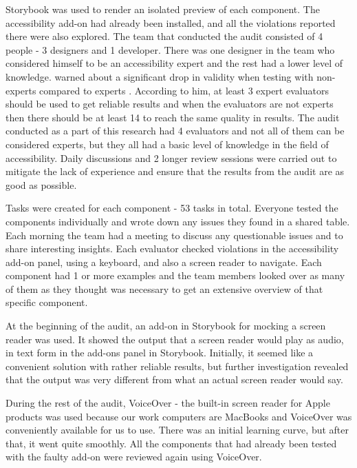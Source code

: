 \documentclass{master_thesis}
\begin{document}
Storybook was used to render an isolated preview of each component. The accessibility add-on had already been installed, and all the violations reported there were also explored. The team that conducted the audit consisted of 4 people - 3 designers and 1 developer.
There was one designer in the team who considered himself to be an accessibility expert and the rest had a lower level of knowledge. \citeauthor{Brajnik2011} warned about a significant drop in validity when testing with non-experts compared to experts \citep{Brajnik2011}. According to him, at least 3 expert evaluators should be used to get reliable results and when the evaluators are not experts then there should be at least 14 to reach the same quality in results. The audit conducted as a part of this research had 4 evaluators and not all of them can be considered experts, but they all had a basic level of knowledge in the field of accessibility. Daily discussions and 2 longer review sessions were carried out to mitigate the lack of experience and ensure that the results from the audit are as good as possible.

Tasks were created for each component - 53 tasks in total. Everyone tested the components individually and wrote down any issues they found in a shared table. Each morning the team had a meeting to discuss any questionable issues and to share interesting insights. Each evaluator checked violations in the accessibility add-on panel, using a keyboard, and also a screen reader to navigate. Each component had 1 or more examples and the team members looked over as many of them as they thought was necessary to get an extensive overview of that specific component.

At the beginning of the audit, an add-on in Storybook for mocking a screen reader \citep{Lara} was used. It showed the output that a screen reader would play as audio, in text form in the add-ons panel in Storybook. Initially, it seemed like a convenient solution with rather reliable results, but further investigation revealed that the output was very different from what an actual screen reader would say.

During the rest of the audit, VoiceOver - the built-in screen reader for Apple products was used because our work computers are MacBooks and VoiceOver was conveniently available for us to use. There was an initial learning curve, but after that, it went quite smoothly. All the components that had already been tested with the faulty add-on were reviewed again using VoiceOver.
\end{document}
